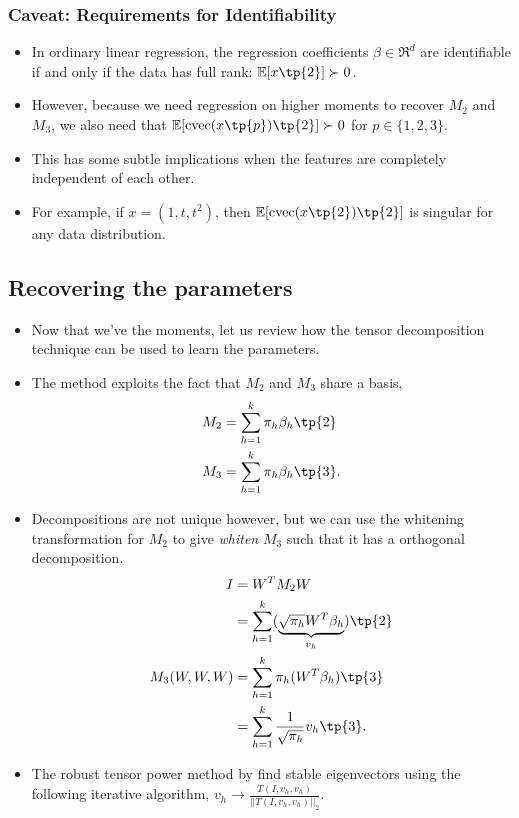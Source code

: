 \documentclass[tablecaption=bottom]{jmlr}
\begin{document}
\subsubsection{Caveat: Requirements for Identifiability}

\begin{itemize}
\item
  In ordinary linear regression, the regression coefficients
  $\beta \in \Re^d$ are identifiable if and only if the data has full
  rank: $\E[x\tp{2}] \succ 0$.
\item
  However, because we need regression on higher moments to recover $M_2$
  and $M_3$, we also need that $\E[\cvec(x\tp{p})\tp{2}] \succ 0$ for
  $p \in \{1,2,3\}$.
\item
  This has some subtle implications when the features are completely
  independent of each other.
\item
  For example, if $x = (1, t, t^2)$, then $\E[\cvec(x\tp{2})\tp{2}]$ is
  singular for any data distribution.
\end{itemize}
\subsection{Recovering the parameters}

\begin{itemize}
\item
  Now that we've the moments, let us review how the tensor decomposition
  technique can be used to learn the parameters.
\item
  The method exploits the fact that $M_2$ and $M_3$ share a basis,
  \begin{align*}
      M_2 &= \sum_{h=1}^k \pi_h \beta_h\tp{2} \\
      M_3 &= \sum_{h=1}^k \pi_h \beta_h\tp{3}.
    \end{align*}
\item
  Decompositions are not unique however, but we can use the whitening
  transformation for $M_2$ to give \emph{whiten} $M_3$ such that it has
  a orthogonal decomposition.
  \begin{align*}
      I &= W^T M_2 W  \\
        &= \sum_{h=1}^k (\underbrace{\sqrt{\pi_h} W^T \beta_h}_{v_h})\tp{2} \\
      M_3(W,W,W) &= \sum_{h=1}^k \pi_h (W^T \beta_h)\tp{3} \\
                 &= \sum_{h=1}^k \frac{1}{\sqrt{\pi_h}} v_h\tp{3}.
    \end{align*}
\item
  The robust tensor power method by \cite{AnandkumarHsuGe2012} find
  stable eigenvectors using the following iterative algorithm,
  $v_h \to \frac{T(I, v_h, v_h)}{||T(I, v_h, v_h)||_2}.$
\end{itemize}
\end{document}
